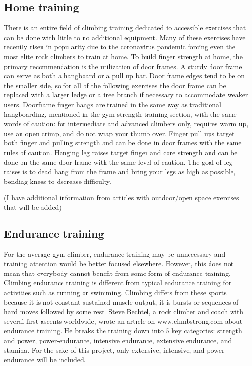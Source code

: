 \documentclass[10pt,twocolumn]{article}
\begin{document}
\subsection{Home training}

	
	There is an entire field of climbing training dedicated to accessible exercises that can be done with little to no additional equipment. Many of these exercises have recently risen in popularity due to the coronavirus pandemic forcing even the most elite rock climbers to train at home. 
	To build finger strength at home, the primary recommendation is the utilization of door frames. A sturdy door frame can serve as both a hangboard or a pull up bar. Door frame edges tend to be on the smaller side, so for all of the following exercises the door frame can be replaced with a larger ledge or a tree branch if necessary to accommodate weaker users. Doorframe finger hangs are trained in the same way as traditional hangboarding, mentioned in the gym strength training section, with the same words of caution: for intermediate and advanced climbers only, requires warm up, use an open crimp, and do not wrap your thumb over. Finger pull ups target both finger and pulling strength and can be done in door frames with the same rules of caution. Hanging leg raises target finger and core strength and can be done on the same door frame with the same level of caution. The goal of leg raises is to dead hang from the frame and bring your legs as high as possible, bending knees to decrease difficulty. 

	(I have additional information from articles with outdoor/open space exercises that will be added)

\subsection{Endurance training}

	For the average gym climber, endurance training may be unnecessary and training attention would be better focused elsewhere. However, this does not mean that everybody cannot benefit from some form of endurance training. Climbing endurance training is different from typical endurance training for activities such as running or swimming. Climbing differs from these sports because it is not constant sustained muscle output, it is bursts or sequences of hard moves followed by some rest. Steve Bechtel, a rock climber and coach with several first ascents worldwide, wrote an article on www.climbstrong.com about endurance training. He breaks the training down into 5 key categories: strength and power, power-endurance, intensive endurance, extensive endurance, and stamina. For the sake of this project, only extensive, intensive, and power endurance will be included.
\end{document}
